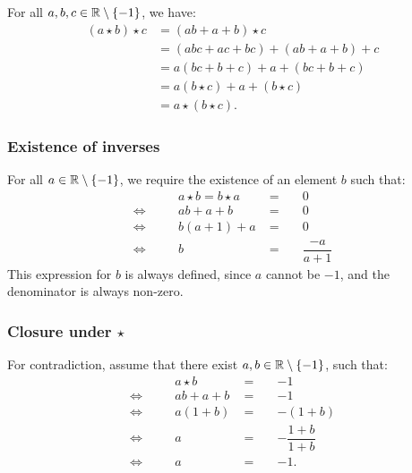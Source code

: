 \documentclass[11pt]{article}
\begin{document}
\begin{enumerate}
          For all $a, b, c \in \mathbb{R} \setminus \{-1\}$, we have:
          \[
              \begin{aligned}
                  (a \star b) \star c & = (ab + a + b) \star c               \\
                                      & = (abc + ac + bc) + (ab + a + b) + c \\
                                      & = a (bc + b + c) + a + (bc + b + c)  \\
                                      & = a (b \star c) + a + (b \star c)    \\
                                      & = a \star (b \star c).
              \end{aligned}
          \]

          \subsubsection*{Existence of inverses}

          For all $a \in \mathbb{R} \setminus \{-1\}$, we require the existence of an element $b$ such that:
          \[
              \begin{alignedat}{3}
                            &  & a \star b = b \star a & \; =\; &  & 0                 \\
                  \iff\quad &  & ab + a + b            & \; =\; &  & 0                 \\
                  \iff\quad &  & b(a + 1) + a          & \; =\; &  & 0                 \\
                  \iff\quad &  & b                     & \; =\; &  & \dfrac{-a}{a + 1}
              \end{alignedat}
          \]
          This expression for $b$ is always defined, since $a$ cannot be $-1$, and the denominator is always non-zero.

          \subsubsection*{Closure under $\star$}

          For contradiction, assume that there exist $a, b \in \mathbb{R} \setminus \{-1\}$, such that:
          \[
              \begin{alignedat}{3}
                            &  & a \star b  & \; = \; &  & -1                    \\
                  \iff\quad &  & ab + a + b & \; = \; &  & -1                    \\
                  \iff\quad &  & a (1 + b)  & \; = \; &  & - (1 + b)             \\
                  \iff\quad &  & a          & \; = \; &  & -\dfrac{1 + b}{1 + b} \\
                  \iff\quad &  & a          & \; = \; &  & -1.                   \\
              \end{alignedat}
          \]


\end{enumerate}
\end{document}

